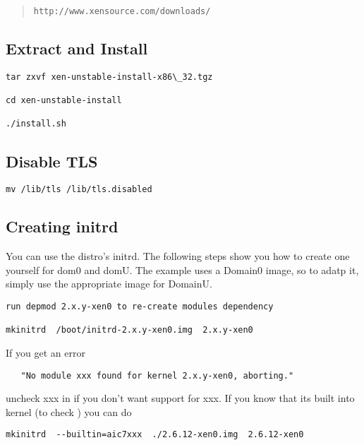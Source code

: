 \begin{quote} {\tt http://www.xensource.com/downloads/}
\end{quote}

\subsection{Extract and Install}

\begin{verbatim}
tar zxvf xen-unstable-install-x86\_32.tgz

cd xen-unstable-install

./install.sh 
\end{verbatim}


\subsection{Disable TLS}

\begin{verbatim}
mv /lib/tls /lib/tls.disabled
\end{verbatim}

\subsection{Creating initrd}

You can use the distro's initrd. The following steps show you how to create one yourself for dom0 and domU. The example uses a Domain0 image, so to adatp it, simply use the appropriate image for DomainU.

\begin{verbatim}
run depmod 2.x.y-xen0 to re-create modules dependency

mkinitrd  /boot/initrd-2.x.y-xen0.img  2.x.y-xen0 
\end{verbatim}

If you get an error

\begin{verbatim}
   "No module xxx found for kernel 2.x.y-xen0, aborting."
\end{verbatim}

uncheck xxx in  if you don't want support for xxx. If you know that its built into kernel (to check ) you can do

\begin{verbatim}
mkinitrd  --builtin=aic7xxx  ./2.6.12-xen0.img  2.6.12-xen0
\end{verbatim}

